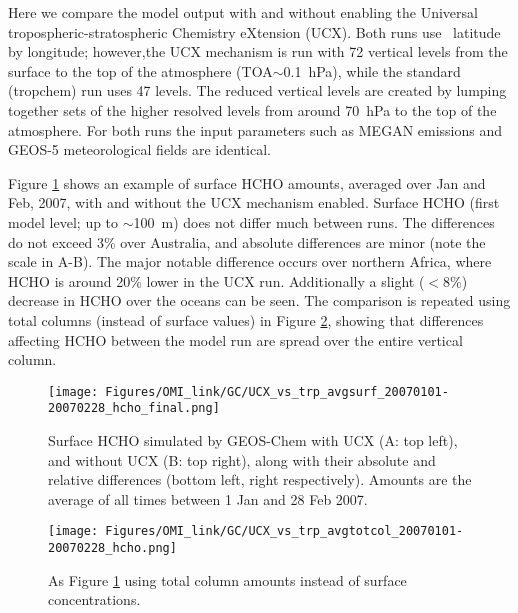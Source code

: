       Here we compare the model output with and without enabling the Universal tropospheric-stratospheric Chemistry eXtension (UCX).
      Both runs use \lowhr ~latitude by longitude; however,the UCX mechanism is run with 72 vertical levels from the surface to the top of the atmosphere (TOA$\sim$0.1~hPa), while the standard (tropchem) run uses 47 levels.
      The reduced vertical levels are created by lumping together sets of the higher resolved levels from around 70~hPa to the top of the atmosphere.
      For both runs the input parameters such as MEGAN emissions and GEOS-5 meteorological fields are identical.
      
      Figure \ref{Model:GC:simulations:comparison:fig_UCXvsTrop_HCHO_surf_fullday} shows an example of surface HCHO amounts, averaged over Jan and Feb, 2007, with and without the UCX mechanism enabled.
      Surface HCHO (first model level; up to $\sim$100~m) does not differ much between runs.
      The differences do not exceed 3\% over Australia, and absolute differences are minor (note the scale in A-B).
      The major notable difference occurs over northern Africa, where HCHO is around 20\% lower in the UCX run.
      Additionally a slight ($<8\%$) decrease in HCHO over the oceans can be seen.
      The comparison is repeated using total columns (instead of surface values) in Figure \ref{Model:GC:simulations:comparison:fig_UCXvsTrop_HCHO_totcol_fullday}, showing that differences affecting HCHO between the model run are spread over the entire vertical column.
      
      \begin{figure}
        \texttt{[image: Figures/OMI\_link/GC/UCX\_vs\_trp\_avgsurf\_20070101-20070228\_hcho\_final.png]}
        \caption{%
          Surface HCHO simulated by GEOS-Chem with UCX (A: top left), and without UCX (B: top right), along with their absolute and relative differences (bottom left, right respectively).
          Amounts are the average of all times between 1 Jan and 28 Feb 2007.
        }
        \label{Model:GC:simulations:comparison:fig_UCXvsTrop_HCHO_surf_fullday}
      \end{figure}
      
      \begin{figure}
        \texttt{[image: Figures/OMI\_link/GC/UCX\_vs\_trp\_avgtotcol\_20070101-20070228\_hcho.png]}
        \caption{%
          As Figure \ref{Model:GC:simulations:comparison:fig_UCXvsTrop_HCHO_surf_fullday} using total column amounts instead of surface concentrations.
        }
        \label{Model:GC:simulations:comparison:fig_UCXvsTrop_HCHO_totcol_fullday}
      \end{figure}
      

